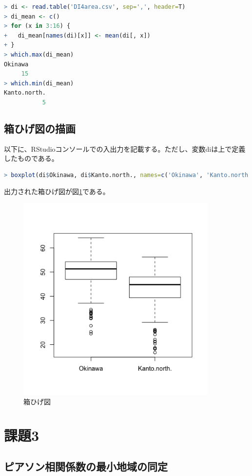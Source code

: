 \documentclass{jsarticle}
\begin{document}
\begin{lstlisting}[language=r]
> di <- read.table('DI4area.csv', sep=',', header=T)
> di_mean <- c()
> for (x in 3:16) {
+   di_mean[names(di)[x]] <- mean(di[, x])
+ }
> which.max(di_mean)
Okinawa
     15
> which.min(di_mean)
Kanto.north.
           5 
\end{lstlisting}

\subsection{箱ひげ図の描画}

以下に、RStudioコンソールでの入出力を記載する。ただし、変数diは上で定義したものである。

\begin{lstlisting}[language=r]
> boxplot(di$Okinawa, di$Kanto.north., names=c('Okinawa', 'Kanto.north.'))
\end{lstlisting}

出力された箱ひげ図が図\ref{ex2}である。

\begin{figure}[H]
 \centering
   \includegraphics[width=100mm]{figures/ex2.png}
 \caption{箱ひげ図}
 \label{ex2}
\end{figure}

\section{課題3}

\subsection{ピアソン相関係数の最小地域の同定}
\end{document}
